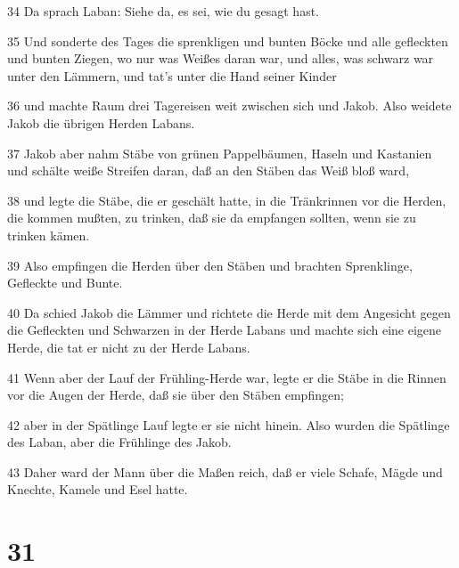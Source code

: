 \par 34 Da sprach Laban: Siehe da, es sei, wie du gesagt hast.
\par 35 Und sonderte des Tages die sprenkligen und bunten Böcke und alle gefleckten und bunten Ziegen, wo nur was Weißes daran war, und alles, was schwarz war unter den Lämmern, und tat's unter die Hand seiner Kinder
\par 36 und machte Raum drei Tagereisen weit zwischen sich und Jakob. Also weidete Jakob die übrigen Herden Labans.
\par 37 Jakob aber nahm Stäbe von grünen Pappelbäumen, Haseln und Kastanien und schälte weiße Streifen daran, daß an den Stäben das Weiß bloß ward,
\par 38 und legte die Stäbe, die er geschält hatte, in die Tränkrinnen vor die Herden, die kommen mußten, zu trinken, daß sie da empfangen sollten, wenn sie zu trinken kämen.
\par 39 Also empfingen die Herden über den Stäben und brachten Sprenklinge, Gefleckte und Bunte.
\par 40 Da schied Jakob die Lämmer und richtete die Herde mit dem Angesicht gegen die Gefleckten und Schwarzen in der Herde Labans und machte sich eine eigene Herde, die tat er nicht zu der Herde Labans.
\par 41 Wenn aber der Lauf der Frühling-Herde war, legte er die Stäbe in die Rinnen vor die Augen der Herde, daß sie über den Stäben empfingen;
\par 42 aber in der Spätlinge Lauf legte er sie nicht hinein. Also wurden die Spätlinge des Laban, aber die Frühlinge des Jakob.
\par 43 Daher ward der Mann über die Maßen reich, daß er viele Schafe, Mägde und Knechte, Kamele und Esel hatte.

\chapter{31}

